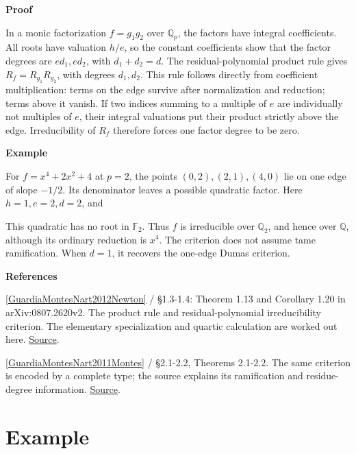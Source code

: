 \documentclass[11pt,a4paper,oneside,openany]{book}
\newcommand{\atlasdisplay}[1]{\par\begingroup\centering\vspace{3pt}\noindent\adjustbox{max width=\linewidth}{\(\displaystyle #1\)}\par\vspace{5pt}\endgroup}
\newenvironment{sources}{\par\smallskip\begingroup\footnotesize\color{atlasgray}\leftskip=10pt\setlength{\parskip}{2pt}}{\par\endgroup\smallskip}
\begin{document}
\begin{atlasblock}[standard]
\textbf{\sffamily Proof}\par\smallskip
\color{black} In a monic factorization \(f=g_1g_2\) over \(\mathbb Q_p\), the factors have integral coefficients. All roots have valuation \(h/e\), so the constant coefficients show that the factor degrees are \(ed_1,ed_2\), with \(d_1+d_2=d\). The residual-polynomial product rule gives \(R_f=R_{g_1}R_{g_2}\), with degrees \(d_1,d_2\). This rule follows directly from coefficient multiplication: terms on the edge survive after normalization and reduction; terms above it vanish. If two indices summing to a multiple of \(e\) are individually not multiples of \(e\), their integral valuations put their product strictly above the edge. Irreducibility of \(R_f\) therefore forces one factor degree to be zero.\par
\end{atlasblock}\color{black}


\begin{atlasblock}[standard]
\textbf{\sffamily Example}\par\smallskip
\color{black} For \(f=x^4+2x^2+4\) at \(p=2\), the points \((0,2),(2,1),(4,0)\) lie on one edge of slope \(-1/2\). Its denominator leaves a possible quadratic factor. Here \(h=1,e=2,d=2\), and\par


\atlasdisplay{R_f(Y)=1+Y+Y^2.}

\color{black} This quadratic has no root in \(\mathbb F_2\). Thus \(f\) is irreducible over \(\mathbb Q_2\), and hence over \(\mathbb Q\), although its ordinary reduction is \(x^4\). The criterion does not assume tame ramification. When \(d=1\), it recovers the one-edge Dumas criterion.\par
\end{atlasblock}\color{black}
\begin{sources}
\textbf{References}\par\smallskip
\noindent\hyperlink{ref:GuardiaMontesNart2012Newton}{[GuardiaMontesNart2012Newton]} / §1.3-1.4: Theorem 1.13 and Corollary 1.20 in arXiv:0807.2620v2. The product rule and residual-polynomial irreducibility criterion. The elementary specialization and quartic calculation are worked out here. \href{https://doi.org/10.1090/S0002-9947-2011-05442-5}{Source}.\par
\noindent\hyperlink{ref:GuardiaMontesNart2011Montes}{[GuardiaMontesNart2011Montes]} / §2.1-2.2, Theorems 2.1-2.2. The same criterion is encoded by a complete type; the source explains its ramification and residue-degree information. \href{https://www.numdam.org/articles/10.5802/jtnb.782/}{Source}.\par
\end{sources}\color{black}
\section{Example}
\end{document}
